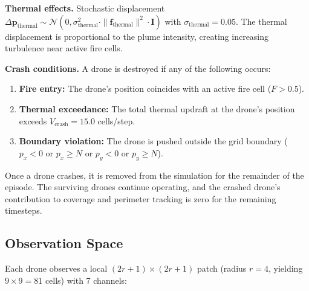 \documentclass[12pt,a4paper]{article}
\DeclareRobustCommand{\cN}{\mathcal{N}}
\DeclareRobustCommand{\vect}[1]{\bm{#1}}
\DeclareRobustCommand{\mat}[1]{\bm{#1}}
\begin{document}
\textbf{Thermal effects.} Stochastic displacement $\Delta\vect{p}_{\text{thermal}} \sim \cN(0, \sigma_{\text{thermal}}^2 \cdot \|\vect{f}_{\text{thermal}}\|^2 \cdot \mat{I})$ with $\sigma_{\text{thermal}} = 0.05$. The thermal displacement is proportional to the plume intensity, creating increasing turbulence near active fire cells.

\textbf{Crash conditions.} A drone is destroyed if any of the following occurs:
\begin{enumerate}[leftmargin=*]
    \item \textbf{Fire entry:} The drone's position coincides with an active fire cell ($F > 0.5$).
    \item \textbf{Thermal exceedance:} The total thermal updraft at the drone's position exceeds $V_{\text{crash}} = 15.0$ cells/step.
    \item \textbf{Boundary violation:} The drone is pushed outside the grid boundary ($p_x < 0$ or $p_x \geq N$ or $p_y < 0$ or $p_y \geq N$).
\end{enumerate}

Once a drone crashes, it is removed from the simulation for the remainder of the episode. The surviving drones continue operating, and the crashed drone's contribution to coverage and perimeter tracking is zero for the remaining timesteps.

\subsection{Observation Space}

Each drone observes a local $(2r+1) \times (2r+1)$ patch (radius $r=4$, yielding $9 \times 9 = 81$ cells) with 7 channels:
\end{document}
